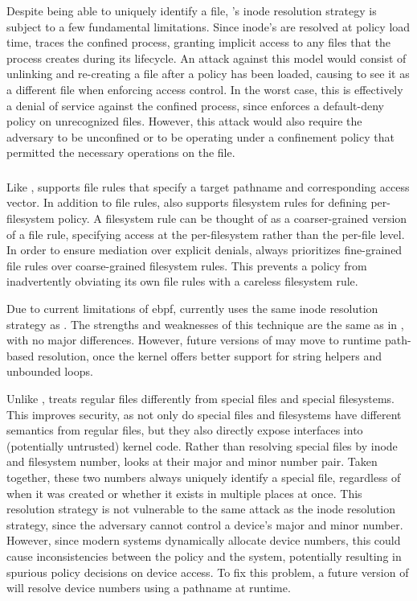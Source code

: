 Despite being able to uniquely identify a file, \bpfbox{}'s inode resolution strategy is
subject to a few fundamental limitations. Since inode's are resolved at policy load time,
\bpfbox{} traces the confined process, granting implicit access to any files that the
process creates during its lifecycle.  An attack against this model would consist of
unlinking and re-creating a file after a policy has been loaded, causing \bpfbox{} to see
it as a different file when enforcing access control. In the worst case, this is
effectively a denial of service against the confined process, since \bpfbox{} enforces
a default-deny policy on unrecognized files. However, this attack would also require the
adversary to be unconfined or to be operating under a confinement policy that permitted
the necessary operations on the file.

\subsubsection{\bpfcontain{}}

Like \bpfbox{}, \bpfcontain{} supports file rules that specify a target pathname and
corresponding access vector. In addition to file rules, \bpfcontain{} also supports
filesystem rules for defining per-filesystem policy. A filesystem rule can be thought of
as a coarser-grained version of a file rule, specifying access at the per-filesystem
rather than the per-file level. In order to ensure mediation over explicit denials,
\bpfcontain{} always prioritizes fine-grained file rules over coarse-grained filesystem
rules. This prevents a policy from inadvertently obviating its own file rules with
a careless filesystem rule.

Due to current limitations of \gls{ebpf}, \bpfcontain{} currently uses the same inode
resolution strategy as \bpfbox{}. The strengths and weaknesses of this technique are the
same as in \bpfbox{}, with no major differences. However, future versions of \bpfcontain{}
may move to runtime path-based resolution, once the kernel offers better support for
string helpers and unbounded loops.

Unlike \bpfbox{}, \bpfcontain{} treats regular files differently from special files and
special filesystems. This improves security, as not only do special files and filesystems
have different semantics from regular files, but they also directly expose interfaces into
(potentially untrusted) kernel code. Rather than resolving special files by inode and
filesystem number, \bpfcontain{} looks at their major and minor number pair. Taken
together, these two numbers always uniquely identify a special file, regardless of when it
was created or whether it exists in multiple places at once. This resolution strategy is
not vulnerable to the same attack as the inode resolution strategy, since the adversary
cannot control a device's major and minor number. However, since modern systems
dynamically allocate device numbers, this could cause inconsistencies between the policy
and the system, potentially resulting in spurious policy decisions on device access. To
fix this problem, a future version of \bpfcontain{} will resolve device numbers using
a pathname at runtime.

